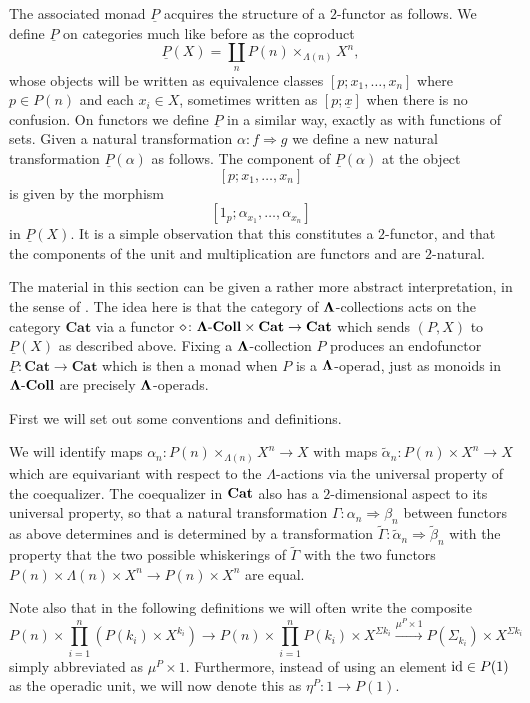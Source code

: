 The associated monad $\underline{P}$ acquires the structure of a $2$-functor as follows. We define $\underline{P}$ on categories much like before as  the coproduct
	\[
		\underline{P}(X) = \coprod_n P(n) \times_{\Lambda(n)} X^n,
	\]
whose objects will be written as equivalence classes $[p;x_1,\ldots,x_n]$ where $p \in P(n)$ and each $x_i \in X$, sometimes written as $[p;\underline{x}]$ when there is no confusion. On functors we define $\underline{P}$ in a similar way, exactly as with functions of sets. Given a natural transformation $\alpha \colon f \Rightarrow g$ we define a new natural transformation $\underline{P}(\alpha)$ as follows. The component of $\underline{P}(\alpha)$ at the object
	\[
		[p;x_1,\ldots,x_n]
	\]
is given by the morphism
	\[
		[1_p;\alpha_{x_1},\ldots,\alpha_{x_n}]
	\]
in $\underline{P}(X)$.
It is a simple observation that this constitutes a $2$-functor, and that the components of the unit and multiplication are functors and are $2$-natural.

\begin{rem}
The material in this section can be given a rather more abstract interpretation, in the sense of \cite{KL97}. The idea here is that the category of $\mathbf{\Lambda}$-collections acts on the category $\mathbf{Cat}$ via a functor $\diamond \colon \mathbf{\Lambda}\text{-}\mathbf{Coll} \times \mathbf{Cat} \rightarrow \mathbf{Cat}$ which sends $(P,X)$ to $\underline{P}(X)$ as described above. Fixing a $\mathbf{\Lambda}$-collection $P$ produces an endofunctor $\underline{P} \colon \mathbf{Cat} \rightarrow \mathbf{Cat}$ which is then a monad when $P$ is a $\mathbf{\Lambda}$-operad, just as monoids in $\mathbf{\Lambda}\text{-}\mathbf{Coll}$ are precisely $\mathbf{\Lambda}$-operads.
\end{rem}


First we will set out some conventions and definitions.
\begin{conv}\label{conv_coeq}
We will identify maps $\alpha_n \colon P(n) \times_{\Lambda(n)} X^n \rightarrow X$ with maps $\tilde{\alpha}_n \colon P(n) \times X^n \rightarrow X$ which are equivariant with respect to the $\Lambda$-actions via the universal property of the coequalizer. The coequalizer in $\mathbf{Cat}$ also has a $2$-dimensional aspect to its universal property, so that a natural transformation $\Gamma \colon \alpha_{n} \Rightarrow \beta_{n}$ between functors as above determines and is determined by a transformation $\tilde{\Gamma} \colon \tilde{\alpha}_{n} \Rightarrow \tilde{\beta}_{n}$ with the property that the two possible whiskerings of $\tilde{\Gamma}$ with the two functors $P(n) \times \Lambda(n) \times X^{n} \rightarrow P(n) \times X^{n}$ are equal.

Note also that in the following definitions we will often write the composite
    \[
        P(n) \times \prod_{i=1}^n \left(P(k_i) \times X^{k_i}\right) \rightarrow P(n) \times \prod_{i=1}^n P(k_i) \times X^{\Sigma k_i} \xrightarrow{\mu^P \times 1} P(\Sigma_{k_i}) \times X^{\Sigma k_i}
    \]
simply abbreviated as $\mu^P \times 1$. Furthermore, instead of using an element $\textrm{id} \in P(1)$ as the operadic unit, we will now denote this as $\eta^{P} \colon 1 \rightarrow P(1)$.
\end{conv}

